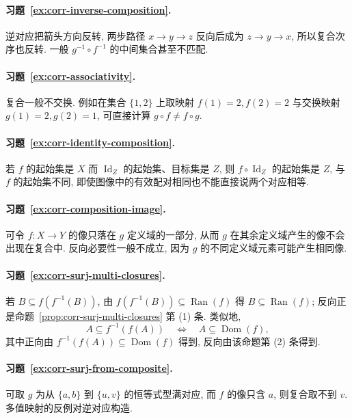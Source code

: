 \documentclass[usesamecnt, thmcnt=section, lang=cn, newtx, 10pt, scheme=chinese]{elegantbook}
\begin{document}
\paragraph*{习题~\ref{ex:corr-inverse-composition}.}
逆对应把箭头方向反转, 两步路径 $x\to y\to z$ 反向后成为 $z\to y\to x$, 所以复合次序也反转. 一般 $g^{-1}\circ f^{-1}$ 的中间集合甚至不匹配.

\paragraph*{习题~\ref{ex:corr-associativity}.}
复合一般不交换. 例如在集合 $\{1,2\}$ 上取映射 $f(1)=2,f(2)=2$ 与交换映射 $g(1)=2,g(2)=1$, 可直接计算 $g\circ f\neq f\circ g$.

\paragraph*{习题~\ref{ex:corr-identity-composition}.}
若 $f$ 的起始集是 $X$ 而 $\operatorname{Id}_Z$ 的起始集、目标集是 $Z$, 则 $f\circ\operatorname{Id}_Z$ 的起始集是 $Z$, 与 $f$ 的起始集不同, 即使图像中的有效配对相同也不能直接说两个对应相等.

\paragraph*{习题~\ref{ex:corr-composition-image}.}
可令 $f:X\to Y$ 的像只落在 $g$ 定义域的一部分, 从而 $g$ 在其余定义域产生的像不会出现在复合中. 反向必要性一般不成立, 因为 $g$ 的不同定义域元素可能产生相同像.


\paragraph*{习题~\ref{ex:corr-surj-multi-closures}.}
若 $B\subseteq f(f^{-1}(B))$, 由 $f(f^{-1}(B))\subseteq\operatorname{Ran}(f)$ 得 $B\subseteq\operatorname{Ran}(f)$; 反向正是命题~\ref{prop:corr-surj-multi-closures} 第 (1) 条. 类似地,
\[
 A\subseteq f^{-1}(f(A))
 \quad\Longleftrightarrow\quad
 A\subseteq\operatorname{Dom}(f),
\]
其中正向由 $f^{-1}(f(A))\subseteq\operatorname{Dom}(f)$ 得到, 反向由该命题第 (2) 条得到.

\paragraph*{习题~\ref{ex:corr-surj-from-composite}.}
可取 $g$ 为从 $\{a,b\}$ 到 $\{u,v\}$ 的恒等式型满对应, 而 $f$ 的像只含 $a$, 则复合取不到 $v$. 多值映射的反例对逆对应构造.
\end{document}
